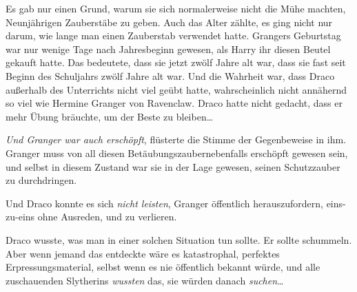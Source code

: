 Es gab nur einen Grund, warum sie sich normalerweise nicht die Mühe machten, Neunjährigen Zauberstäbe zu geben. Auch das Alter zählte, es ging nicht nur darum, wie lange man einen Zauberstab verwendet hatte. Grangers Geburtstag war nur wenige Tage nach Jahresbeginn gewesen, als Harry ihr diesen Beutel gekauft hatte. Das bedeutete, dass sie jetzt zwölf Jahre alt war, dass sie fast seit Beginn des Schuljahrs zwölf Jahre alt war. Und die Wahrheit war, dass Draco außerhalb des Unterrichts nicht viel geübt hatte, wahrscheinlich nicht annähernd so viel wie Hermine Granger von Ravenclaw. Draco hatte nicht gedacht, dass er mehr Übung bräuchte, um der Beste zu bleiben…

\emph{Und Granger war auch erschöpft}, flüsterte die Stimme der Gegenbeweise in ihm. Granger muss von all diesen Betäubungszaubernebenfalls erschöpft gewesen sein, und selbst in diesem Zustand war sie in der Lage gewesen, seinen Schutzzauber zu durchdringen.

Und Draco konnte es sich \emph{nicht leisten}, Granger öffentlich herauszufordern, eins-zu-eins ohne Ausreden, und zu verlieren.

Draco wusste, was man in einer solchen Situation tun sollte. Er sollte schummeln. Aber wenn jemand das entdeckte wäre es katastrophal, perfektes Erpressungsmaterial, selbst wenn es nie öffentlich bekannt würde, und alle zuschauenden Slytherins \emph{wussten} das, sie würden danach \emph{suchen}…

